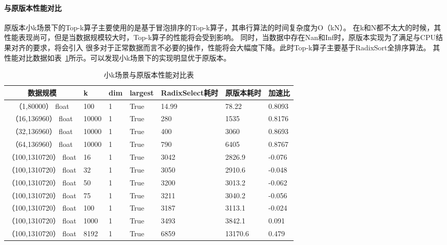 \paragraph{与原版本性能对比}
原版本小k场景下的Top-k算子主要使用的是基于冒泡排序的Top-k算子，其串行算法的时间复杂度为O（kN）。
在k和N都不太大的时候，其性能表现尚可，但是当数据规模较大时，Top-k算子的性能将会受到影响。
同时，当数据中存在Nan和Inf时，原版本实现为了满足与CPU结果对齐的要求，将会引入
很多对于正常数据而言不必要的操作，性能将会大幅度下降。此时Top-k算子主要基于RadixSort全排序算法。
其性能对比数据如表~\ref{tab:bench_littlek}所示。可以发现小k场景下的实现明显优于原版本。
\begin{table}
    \centering
    \caption{小k场景与原版本性能对比表}
    \label{tab:bench_littlek}
    \begin{tabular}{cllllll}
        \toprule
        数据规模       &k  & dim  & largest & RadixSelect耗时    & 原版本耗时 &加速比\\
        \midrule
        （1,80000） float&100&  1     & True      & 14.99 & 78.22 & 0.8093\\

        （16,136960） float&10000&  1     & True      & 280 & 1535 & 0.8176\\
        （32,136960） float&10000&  1     & True      & 400 & 3060 & 0.8693\\
        （64,136960） float&10000&  1     & True      & 790 & 6405 & 0.8767\\
        
        （100,1310720） float&16&  1     & True      & 3042 & 2826.9 &  -0.076\\
        （100,1310720） float&32&  1     & True      &  3050& 2910.6 &  -0.048\\
        （100,1310720） float&50&  1     & True      & 3200 & 3013.2 &  -0.062 \\
        （100,1310720） float&75&  1     & True      & 3211 & 3040.2 &  -0.056 \\
        （100,1310720） float&100&  1     & True      & 3187& 3113.1 &  -0.024 \\
        （100,1310720） float&1000&  1     & True     & 3493& 3842.1 &   0.091 \\
        （100,1310720） float&8192&  1     & True      & 6859& 13170.6 & 0.479 \\
      
        

        \bottomrule
    \end{tabular}
    \end{table}

